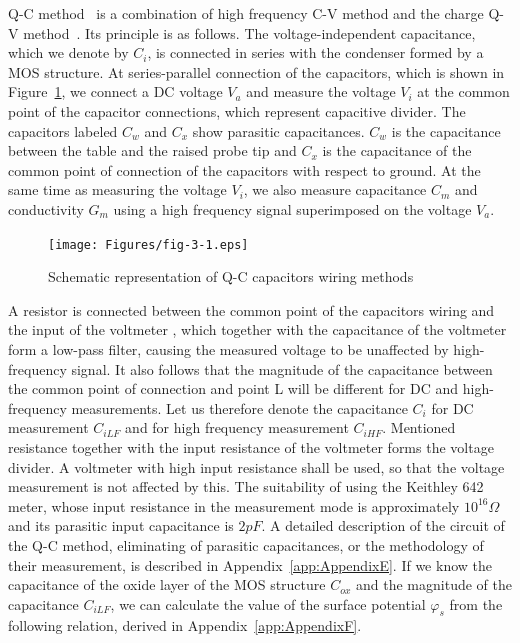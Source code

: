 Q-C method~\cite{3.4} is a combination of high frequency C-V method
and the charge Q-V method~\cite{3.5}. Its principle is as follows. The
voltage-independent capacitance, which we denote by $C_i$, is
connected in series with the condenser formed by a MOS structure. At
series-parallel connection of the capacitors, which is shown in
Figure~\ref{fig:3.1}, we connect a DC voltage $V_a$ and measure the
voltage $V_i$ at the common point of the capacitor connections, which
represent capacitive divider. The capacitors labeled $C_w$ and $C_x$
show parasitic capacitances. $C_w$ is the capacitance between the
table and the raised probe tip and $C_x$ is the capacitance of the
common point of connection of the capacitors with respect to
ground. At the same time as measuring the voltage $V_i$, we also
measure capacitance $C_m$ and conductivity $G_m$ using a high
frequency signal superimposed on the voltage $V_a$.

\begin{figure}[h!]\centering
  \texttt{[image: Figures/fig-3-1.eps]}%
  \caption[Schematic illustration of Q-C capacitor wiring
    methods]{Schematic representation of Q-C capacitors wiring
    methods}\label{fig:3.1}
\end{figure}

A resistor is connected between the common point of the capacitors
wiring and the input of the voltmeter , which together with the
capacitance of the voltmeter form a low-pass filter, causing the
measured voltage to be unaffected by high-frequency signal. It also
follows that the magnitude of the capacitance between the common point
of connection and point L will be different for DC and high-frequency
measurements. Let us therefore denote the capacitance $C_i$ for DC
measurement $C_{iLF}$ and for high frequency measurement $C_{iHF}$.
Mentioned resistance together with the input resistance of the
voltmeter forms the voltage divider. A voltmeter with high input
resistance shall be used, so that the voltage measurement is not
affected by this.  The suitability of using the Keithley 642 meter,
whose input resistance in the measurement mode is approximately
$10^{16} \Omega$ and its parasitic input capacitance is $2 pF$. A
detailed description of the circuit of the Q-C method, eliminating of
parasitic capacitances, or the methodology of their measurement, is
described in Appendix~\ref{app:AppendixE}. If we know the capacitance
of the oxide layer of the MOS structure $C_{ox}$ and the magnitude of
the capacitance $C_{iLF}$, we can calculate the value of the surface
potential $\varphi_s$ from the following relation, derived in
Appendix~\ref{app:AppendixF}.

